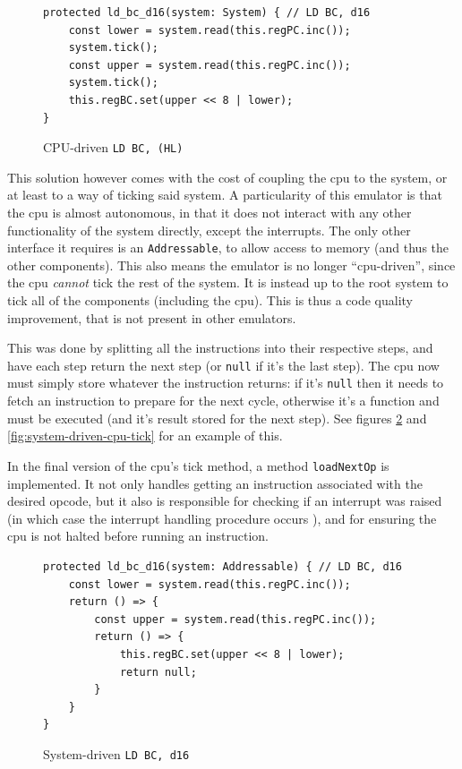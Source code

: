 \documentclass[11pt]{informatics-report}
\begin{document}
\begin{figure}[h]
    \begin{verbatim}
protected ld_bc_d16(system: System) { // LD BC, d16
    const lower = system.read(this.regPC.inc());
    system.tick();
    const upper = system.read(this.regPC.inc());
    system.tick();
    this.regBC.set(upper << 8 | lower);
}
    \end{verbatim}
    \caption{CPU-driven \texttt{LD BC, (HL)}}
    \label{fig:cpu-driven-ld}
\end{figure}

This solution however comes with the cost of coupling the \gls{cpu} to the system, or at least to a way of ticking said system. A particularity of this emulator is that the \gls{cpu} is almost autonomous, in that it does not interact with any other functionality of the system directly, except the interrupts. The only other interface it requires is an \texttt{Addressable}, to allow access to memory (and thus the other components). This also means the emulator is no longer ``\gls{cpu}-driven'', since the \gls{cpu} \textit{cannot} tick the rest of the system. It is instead up to the root system to tick all of the components (including the \gls{cpu}). This is thus a code quality improvement, that is not present in other emulators.

This was done by splitting all the instructions into their respective steps, and have each step return the next step (or \texttt{null} if it's the last step). The \gls{cpu} now must simply store whatever the instruction returns: if it's \texttt{null} then it needs to fetch an instruction to prepare for the next cycle, otherwise it's a function and must be executed (and it's result stored for the next step). See figures \ref{fig:system-driven-ld} and \ref{fig:system-driven-cpu-tick} for an example of this.

In the final version of the \gls{cpu}'s tick method, a method \texttt{loadNextOp} is implemented. It not only handles getting an instruction associated with the desired opcode, but it also is responsible for checking if an interrupt was raised (in which case the interrupt handling procedure occurs \cite[Interrupts]{pandoc}), and for ensuring the \gls{cpu} is not halted before running an instruction.

\begin{figure}[h]
    \begin{verbatim}
protected ld_bc_d16(system: Addressable) { // LD BC, d16
    const lower = system.read(this.regPC.inc());
    return () => {
        const upper = system.read(this.regPC.inc());
        return () => {
            this.regBC.set(upper << 8 | lower);
            return null;
        }
    }
}
    \end{verbatim}
    \caption{System-driven \texttt{LD BC, d16}}
    \label{fig:system-driven-ld}
\end{figure}
\end{document}
